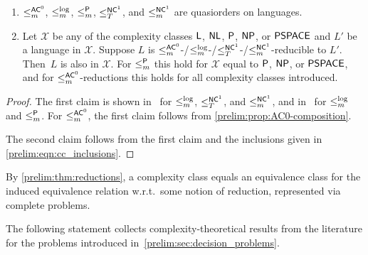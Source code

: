 \begin{theorem}\label{prelim:thm:reductions}
	\begin{enumerate}
	\item $\le_m^{\textup{\textsf{AC}}^0}$, $\le_m^{\log}$, $\le_m^{\textup{\textsf{P}}}$, $\le_T^{\textup{\textsf{NC}}^{1}}$, and $\le_m^{\textup{\textsf{NC}}^{1}}$
	are quasiorders on languages.
	
	\item \label{prelim:thm:reductions:2}	Let $\mathcal X$ be any of the complexity classes $\textsf{L}$, $\textup{\textsf{NL}}$, $\textup{\textsf{P}}$, $\textup{\textsf{NP}}$, or $\textup{\textsf{PSPACE}}$
	and $L'$ be a language in $\mathcal X$.
	Suppose $L$ is $\le_m^{\textup{\textsf{AC}}^0}$-/$\le_m^{\log}$-/$\le_T^{\textup{\textsf{NC}}^{1}}$-/$\le_m^{\textup{\textsf{NC}}^{1}}$-reducible
	to $L'$. Then~$L$ is also in $\mathcal X$.
	For $\le_m^{\textup{\textsf{P}}}$ this hold for $\mathcal X$ equal to  $\textup{\textsf{P}}$, $\textup{\textsf{NP}}$, or $\textup{\textsf{PSPACE}}$,
	and for  $\le_m^{\textup{\textsf{AC}}^0}$-reductions
	this holds for all complexity classes introduced.
	\end{enumerate}
\end{theorem}
\begin{proof}
The first claim is shown in~\cite[Lem.~4.81]{Vollmer99}
for $\le_m^{\log}$, $\le_T^{\textup{\textsf{NC}}^{1}}$, and $\le_m^{\textup{\textsf{NC}}^{1}}$,
and in~\cite[p.~322 \& 323]{HopUll79}
for $\le_m^{\log}$ and $\le_m^{\textup{\textsf{P}}}$.
For $\le_m^{\textup{\textsf{AC}}^0}$, the first claim follows from \cref{prelim:prop:AC0-composition}.

The second claim follows from the first claim
and the inclusions given in \cref{prelim:eqn:cc_inclusions}.
\end{proof}

By \cref{prelim:thm:reductions},
a complexity class equals an equivalence class for the induced equivalence relation w.r.t.~some notion of reduction,
represented via complete problems.

The following statement collects complexity-theoretical results from the literature for the problems introduced in~\cref{prelim:sec:decision_problems}.

